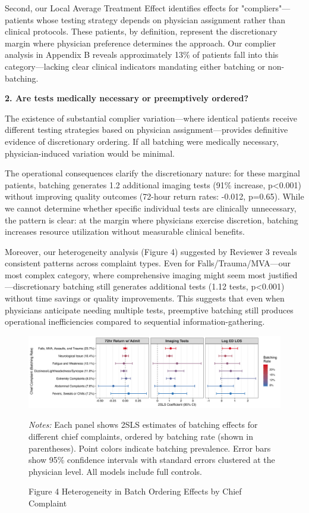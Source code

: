 \documentclass[11pt]{article}
\newcommand{\1}{\hbox{\rm 1\kern-.35em 1}}
\begin{document}
Second, our Local Average Treatment Effect identifies effects for "compliers"—patients whose testing strategy depends on physician assignment rather than clinical protocols. These patients, by definition, represent the discretionary margin where physician preference determines the approach. Our complier analysis in Appendix B reveals approximately 13\% of patients fall into this category—lacking clear clinical indicators mandating either batching or non-batching.

\textbf{2. Are tests medically necessary or preemptively ordered?}

The existence of substantial complier variation—where identical patients receive different testing strategies based on physician assignment—provides definitive evidence of discretionary ordering. If all batching were medically necessary, physician-induced variation would be minimal.

The operational consequences clarify the discretionary nature: for these marginal patients, batching generates 1.2 additional imaging tests (91\% increase, p<0.001) without improving quality outcomes (72-hour return rates: -0.012, p=0.65). While we cannot determine whether specific individual tests are clinically unnecessary, the pattern is clear: at the margin where physicians exercise discretion, batching increases resource utilization without measurable clinical benefits.

Moreover, our heterogeneity analysis (Figure 4) suggested by Reviewer 3 reveals consistent patterns across complaint types. Even for Falls/Trauma/MVA—our most complex category, where comprehensive imaging might seem most justified—discretionary batching still generates additional tests (1.12 tests, p<0.001) without time savings or quality improvements. This suggests that even when physicians anticipate needing multiple tests, preemptive batching still produces operational inefficiencies compared to sequential information-gathering.

\begin{figure}[h]
\centering
\caption*{Figure 4  Heterogeneity in Batch Ordering Effects by Chief Complaint}
\begin{threeparttable}
\includegraphics[width=\textwidth]{../outputs/figures/heterogeneity_by_complaint.png}    
\begin{tablenotes}
\small
\item \textit{Notes:} Each panel shows 2SLS estimates of batching effects for different chief complaints, ordered by batching rate (shown in parentheses). Point colors indicate batching prevalence. Error bars show 95\% confidence intervals with standard errors clustered at the physician level. All models include full controls.
\end{tablenotes}
\end{threeparttable}
\end{figure}
\end{document}
